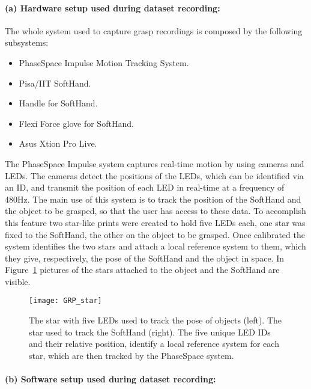 \paragraph{(a) Hardware setup used during dataset recording:}
The whole system used to capture grasp recordings is composed by the following subsystems:
\begin{itemize}
  \item PhaseSpace Impulse Motion Tracking System.
  \item Pisa/IIT SoftHand.
  \item Handle for SoftHand.
  \item Flexi Force glove for SoftHand.
  \item Asus Xtion Pro Live.
\end{itemize}

The PhaseSpace Impulse system captures real-time motion by using cameras and LEDs.
The cameras detect the positions of the LEDs, which can be identified via an ID, and transmit the position of each LED in real-time at a frequency of 480Hz.
The main use of this system is to track the position of the SoftHand and the object to be grasped, so that the user has access to these data. 
To accomplish this feature two star-like prints were created to hold five LEDs each, one star was fixed to the SoftHand, the other on the object to be grasped.
Once calibrated the system identifies the two stars and attach a local reference system to them, which they give, respectively, the pose of the SoftHand and the object in space. %
In Figure~\ref{fig:grasp:star} pictures of the stars attached to the object and the SoftHand are visible.
\begin{figure}[b!]
  \centering
  \texttt{[image: GRP\_star]}
  \caption{The star with five LEDs used to track the pose of objects (left). The star used to track the SoftHand (right). The five unique LED IDs and their relative position, identify a local reference system for each star, which are then tracked by the PhaseSpace system.}
  \label{fig:grasp:star}
\end{figure}

\paragraph{(b) Software setup used during dataset recording:}
